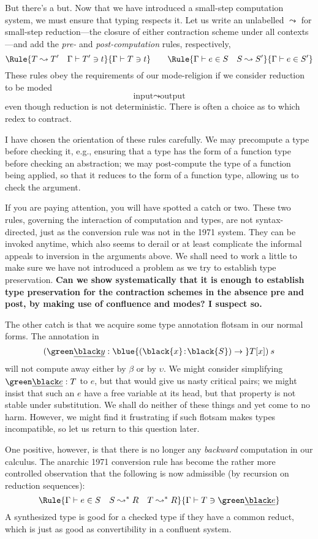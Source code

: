 \documentclass[natbib]{article}
\newcommand{\hb}{\!:\!}
\newcommand{\PI}[2]{\blue{(\black{#1}\hb \black{#2})\to\;}}
\begin{document}
But there's a but. Now that we have introduced a small-step computation system, we must ensure that typing respects it. Let us write an unlabelled $\leadsto$ for small-step reduction---the closure of either contraction scheme under all contexts---and add the \emph{pre-} and \emph{post-computation} rules, respectively,
\[
\Rule{T\leadsto T'\quad \CHK\Gamma{T'}t}
     {\CHK\Gamma Tt}
\qquad
\Rule{\SYN\Gamma eS \quad S\leadsto S'}
     {\SYN\Gamma e{S'}}
\]
These rules obey the requirements of our mode-religion if we consider reduction to be moded
\[
\mbox{input}\leadsto\mbox{output}
\]
even though reduction is not deterministic. There is often a choice as to which redex to contract.

I have chosen the orientation of these rules carefully. We may precompute a type before checking it, e.g., ensuring that a type has the form of a function type before checking an abstraction; we may post-compute the type of a function being applied, so that it reduces to the form of a function type, allowing us to check the argument.

If you are paying attention, you will have spotted a catch or two. These two rules, governing the interaction of computation and types, are not syntax-directed, just as the conversion rule was not in the 1971 system. They can be invoked anytime, which also seems to derail or at least complicate the informal appeals to inversion in the arguments above. We shall need to work a little to make sure we have not introduced a problem as we try to establish type preservation. \textbf{Can we show systematically that it is enough to establish type preservation for the contraction schemes in the absence pre and post, by making use of confluence and modes? I suspect so.}

The other catch is that we acquire some type annotation flotsam in our normal forms. The annotation in
\[
  (\el y : \PI xS T[x])\:s
\]
will not compute away either by $\beta$ or by $\upsilon$. We might consider simplifying $\el e : T$ to $e$,
but that would give us nasty critical pairs; we might insist that such an $e$ have a free variable at its head, but that property is not stable under substitution. We shall do neither of these things and yet come to no harm.
However, we might find it frustrating if such flotsam makes types incompatible, so let us return to this question later.

One positive, however, is that there is no longer any \emph{backward} computation in our calculus. The anarchic 1971 conversion rule has become the rather more controlled observation that the following is now admissible (by recursion on reduction sequences):
\[\Rule{\SYN\Gamma eS \quad S\leadsto^\ast R \quad T\leadsto^\ast R}
       {\CHK\Gamma T{\el e}}
\]
A synthesized type is good for a checked type if they have a common reduct, which is just as good as convertibility in a confluent system.
\end{document}
